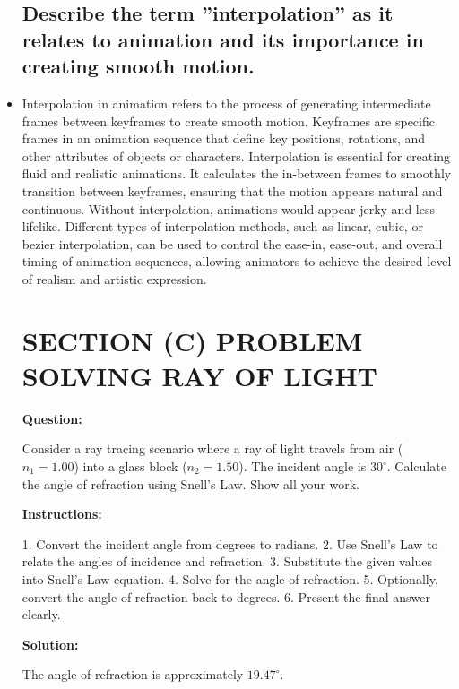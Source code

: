 \documentclass{article}
\begin{document}
\begin{itemize}
\subsection{Describe the term ”interpolation” as it relates
to animation and its importance in creating smooth
motion.}
\item  Interpolation in animation refers to the process of generating intermediate
frames between keyframes to create smooth motion. Keyframes are specific frames in an animation sequence that define key positions, rotations,
and other attributes of objects or characters. Interpolation is essential
for creating fluid and realistic animations. It calculates the in-between
frames to smoothly transition between keyframes, ensuring that the motion appears natural and continuous. Without interpolation, animations
would appear jerky and less lifelike. Different types of interpolation methods, such as linear, cubic, or bezier interpolation, can be used to control
the ease-in, ease-out, and overall timing of animation sequences, allowing
animators to achieve the desired level of realism and artistic expression.
\section{ SECTION (C) PROBLEM SOLVING RAY
OF LIGHT}

\textbf{Question:}

Consider a ray tracing scenario where a ray of light travels from air ($n_1 = 1.00$) into a glass block ($n_2 = 1.50$). The incident angle is $30^\circ$. Calculate the angle of refraction using Snell's Law. Show all your work.

\textbf{Instructions:}

1. Convert the incident angle from degrees to radians.
2. Use Snell's Law to relate the angles of incidence and refraction.
3. Substitute the given values into Snell's Law equation.
4. Solve for the angle of refraction.
5. Optionally, convert the angle of refraction back to degrees.
6. Present the final answer clearly.

\textbf{Solution:}

The angle of refraction is approximately $19.47^\circ$.


\end{itemize}
\end{document}
